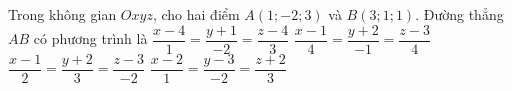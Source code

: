 \begin{ex}%
	Trong không gian $Oxyz$, cho hai  điểm $A(1;-2;3)$ và $B(3;1;1)$. Đường thẳng $AB$ có phương trình là
	\choice 
		{$\dfrac{x-4}{1}=\dfrac{y+1}{-2}=\dfrac{z-4}{3}$} 
		{$\dfrac{x-1}{4}=\dfrac{y+2}{-1}=\dfrac{z-3}{4}$} 
		{\True  $\dfrac{x-1}{2}=\dfrac{y+2}{3}=\dfrac{z-3}{-2}$}
		 {$\dfrac{x-2}{1}=\dfrac{y-3}{-2}=\dfrac{z+2}{3}$}
\end{ex}
